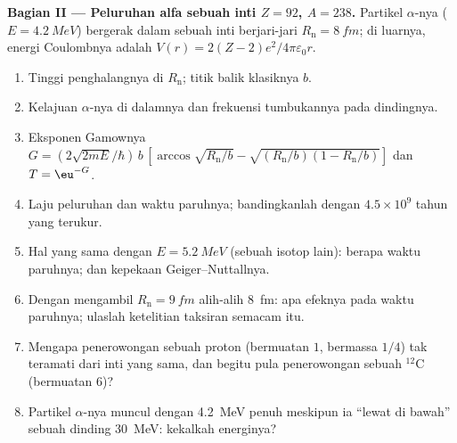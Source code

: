 \begin{problem}
\textbf{Bagian II --- Peluruhan alfa sebuah inti $Z = 92$, $A = 238$.}
Partikel $\alpha$-nya ($E = \qty{4.2}{MeV}$) bergerak dalam sebuah inti berjari-jari
$R_{\text{n}} = \qty{8}{fm}$; di luarnya, energi Coulombnya adalah $V(r) =
2(Z - 2)e^2/4\pi\varepsilon_0r$.
\begin{enumerate}[resume]
  \item Tinggi penghalangnya di $R_{\text{n}}$; titik balik klasiknya
        $b$.
  \item Kelajuan $\alpha$-nya di dalamnya dan frekuensi tumbukannya pada
        dindingnya.
  \item Eksponen Gamownya $G = (2\sqrt{2mE}/\hbar)\,b\,[\arccos\sqrt{R_{\text{n}}/b}
        - \sqrt{(R_{\text{n}}/b)(1 - R_{\text{n}}/b)}]$ dan $T = \eu^{-G}$.
  \item Laju peluruhan dan waktu paruhnya; bandingkanlah dengan $4.5 \times
        10^9$ tahun yang terukur.
  \item Hal yang sama dengan $E = \qty{5.2}{MeV}$ (sebuah isotop lain): berapa waktu paruhnya;
        dan kepekaan Geiger--Nuttallnya.
  \item Dengan mengambil $R_{\text{n}} = \qty{9}{fm}$ alih-alih \qty{8}{fm}: apa efeknya pada
        waktu paruhnya; ulaslah ketelitian taksiran semacam itu.
  \item Mengapa penerowongan sebuah proton (bermuatan $1$, bermassa $1/4$)
        tak teramati dari inti yang sama, dan begitu pula penerowongan sebuah $^{12}$C
        (bermuatan $6$)?
  \item Partikel $\alpha$-nya muncul dengan \qty{4.2}{MeV} penuh meskipun ia
        ``lewat di bawah'' sebuah dinding \qty{30}{MeV}: kekalkah energinya?
\end{enumerate}


\end{problem}
